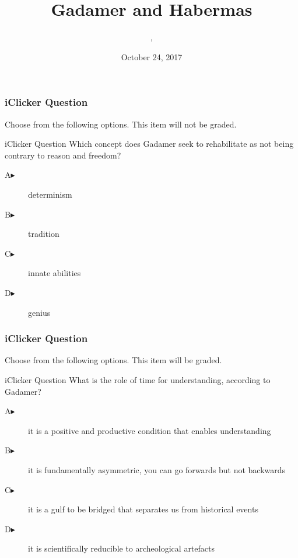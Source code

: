 \documentclass[xcolor=dvipsnames]{beamer}
\title{Gadamer and Habermas}
\subtitle{{\CourseNumber}, {\CourseInst}}
\author{\CourseName}
\date{October 24, 2017}
\begin{document}
\begin{frame}
  \titlepage
\end{frame}

\begin{frame}
  \frametitle{iClicker Question}
Choose from the following options. This item will not be graded.
\begin{block}{iClicker Question}
Which concept does Gadamer seek to rehabilitate as not being contrary
to reason and freedom?
\end{block}
\begin{description}
\item[A\hspace{.2in}$\blacktriangleright$] determinism
\item[B\hspace{.2in}$\blacktriangleright$] tradition
\item[C\hspace{.2in}$\blacktriangleright$] innate abilities
\item[D\hspace{.2in}$\blacktriangleright$] genius
\end{description}
\end{frame}

\begin{frame}
  \frametitle{iClicker Question}
Choose from the following options. This item will be graded.
\begin{block}{iClicker Question}
What is the role of time for understanding, according to Gadamer?
\end{block}
\begin{description}
\item[A\hspace{.2in}$\blacktriangleright$] it is a positive and productive condition that enables understanding
\item[B\hspace{.2in}$\blacktriangleright$] it is fundamentally asymmetric, you can go forwards but not backwards
\item[C\hspace{.2in}$\blacktriangleright$] it is a gulf to be bridged that separates us from historical events
\item[D\hspace{.2in}$\blacktriangleright$] it is scientifically reducible to archeological artefacts
\end{description}
\end{frame}
\end{document}
